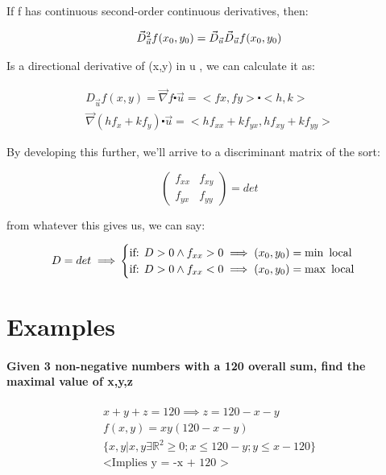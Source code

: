 \documentclass[11pt,fleqn]{book} %
\begin{document}
If f has continuous second-order continuous derivatives, then:

\begin{equation}
    \vec{D}^2_{\vec{u}} f(x_0,y_0) = \vec{D}_{\vec{u}} \vec{D}_{\vec{u}} f(x_0,y_0)\\
\end{equation}

Is a directional derivative of (x,y) in u , we can calculate it as:

\begin{gather}
    D_{\vec{u}}f(x,y) =\vec{\nabla} f \centerdot \vec{u} = <fx, fy> \centerdot <h,k> \\
    \vec{\nabla}(h f_x+ k f_y) \centerdot \vec{u} = <h f_{xx} + k f_{yx}, h f_{xy} + k f_{yy}>
\end{gather}

By developing this further, we'll arrive to a discriminant matrix of the sort:

\begin{equation}
    \begin{pmatrix}
        f_{xx} & f_{xy} \\
        f_{yx} & f_{yy}
    \end{pmatrix} = det
\end{equation}

from whatever this gives us, we can say:

\begin{equation}
    D = det \implies \\
    \begin{cases}
    \text{if: } D > 0 \wedge  f_{xx} > 0 \implies (x_0 , y_0) = \min \text{ local} \\
    \text{if: } D > 0 \wedge  f_{xx} < 0 \implies (x_0 , y_0) = \max \text{ local} \\            
    
    \end{cases}
\end{equation}

\section{Examples}

\paragraph*{Given 3 non-negative numbers with a 120 overall sum, find the maximal value of x,y,z}
\begin{gather}
    x+y+z=120 \implies z = 120-x-y \\
    f(x,y) = xy(120-x-y)\\
    \{ x,y | x,y \exists \mathbb{R}^2 \geq 0; x \leq 120 - y; y \leq x - 120 \} \\
    \text{<Implies y = -x + 120 >}
\end{gather}
\end{document}

